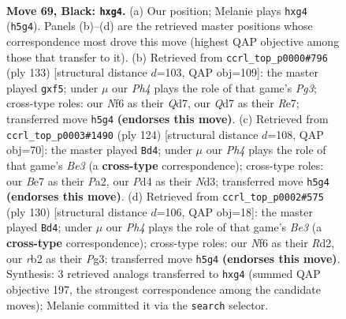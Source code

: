 \documentclass[11pt]{article}
\begin{document}
\clearpage

\begin{figure}[p]\centering
\begin{subfigure}{0.46\textwidth}\centering
\resizebox{\linewidth}{!}{%
\newchessgame
\chessboard[
  setfen={5r2/3qb1k1/5n2/P1p2p1p/3p1PP1/3Q4/1R1BPK2/3N4 b - - 0 69},
  showmover=false,
  pgfstyle=straightmove, color=movearrow, markmove={h5-g4}
]}
\caption{}
\end{subfigure}\hfill
\begin{subfigure}{0.46\textwidth}\centering
\resizebox{\linewidth}{!}{%
\newchessgame
\chessboard[
  setfen={6k1/1p1qr3/2n3p1/1N2pP2/3pQ1P1/3P2KR/r7/1R6 b - - 0 67},
  showmover=false,
  pgfstyle=straightmove, color=movearrow, markmove={g6-f5}
]}
\caption{}
\end{subfigure}
\\[4pt]
\begin{subfigure}{0.46\textwidth}\centering
\resizebox{\linewidth}{!}{%
\newchessgame
\chessboard[
  setfen={4rnk1/2bq1p2/8/p3P1p1/1p2Q1P1/1P1NBP2/P2K4/7R w - - 8 63},
  showmover=false,
  pgfstyle=straightmove, color=movearrow, markmove={e3-d4}
]}
\caption{}
\end{subfigure}\hfill
\begin{subfigure}{0.46\textwidth}\centering
\resizebox{\linewidth}{!}{%
\newchessgame
\chessboard[
  setfen={b3r3/5pbk/p5p1/4P2p/4qP1P/4B1PB/3R3K/5Q2 w - - 4 66},
  showmover=false,
  pgfstyle=straightmove, color=movearrow, markmove={e3-d4}
]}
\caption{}
\end{subfigure}
\caption{\textbf{Move 69, Black: \texttt{hxg4}.} (a) Our position; Melanie plays \texttt{hxg4} (\texttt{h5g4}). Panels (b)--(d) are the retrieved master positions whose correspondence most drove this move (highest QAP objective among those that transfer to it). (b) Retrieved from \texttt{ccrl\_top\_p0000\#796} (ply 133) [structural distance $d$=103, QAP obj=109]: the master played \texttt{gxf5}; under $\mu$ our \emph{Ph4} plays the role of that game's \emph{Pg3}; cross-type roles: our \emph{N}f6 as their \emph{Q}d7, our \emph{Q}d7 as their \emph{R}e7; transferred move \texttt{h5g4} \textbf{(endorses this move)}. (c) Retrieved from \texttt{ccrl\_top\_p0003\#1490} (ply 124) [structural distance $d$=108, QAP obj=70]: the master played \texttt{Bd4}; under $\mu$ our \emph{Ph4} plays the role of that game's \emph{Be3} (a \textbf{cross-type} correspondence); cross-type roles: our \emph{B}e7 as their \emph{P}a2, our \emph{P}d4 as their \emph{N}d3; transferred move \texttt{h5g4} \textbf{(endorses this move)}. (d) Retrieved from \texttt{ccrl\_top\_p0002\#575} (ply 130) [structural distance $d$=106, QAP obj=18]: the master played \texttt{Bd4}; under $\mu$ our \emph{Ph4} plays the role of that game's \emph{Be3} (a \textbf{cross-type} correspondence); cross-type roles: our \emph{N}f6 as their \emph{R}d2, our \emph{r}b2 as their \emph{P}g3; transferred move \texttt{h5g4} \textbf{(endorses this move)}. Synthesis: 3 retrieved analogs transferred to \texttt{hxg4} (summed QAP objective 197, the strongest correspondence among the candidate moves); Melanie committed it via the \texttt{search} selector.}
\label{fig:thought-m137}
\end{figure}
\end{document}
